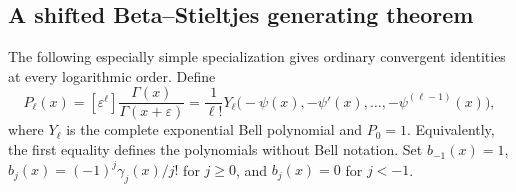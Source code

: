 \subsection{A shifted Beta--Stieltjes generating theorem}

The following especially simple specialization gives ordinary convergent
identities at every logarithmic order. Define
\begin{equation}\label{agrc:Pell}
 P_\ell(x)=[\varepsilon^\ell]\frac{\Gamma(x)}{\Gamma(x+\varepsilon)}
 =\frac1{\ell!}Y_\ell\bigl(-\psi(x),-\psi'(x),\ldots,
                                      -\psi^{(\ell-1)}(x)\bigr),
\end{equation}
where $Y_\ell$ is the complete exponential Bell polynomial and $P_0=1$.
Equivalently, the first equality defines the polynomials without Bell
notation. Set $b_{-1}(x)=1$, $b_j(x)=(-1)^j\gamma_j(x)/j!$ for $j\geq0$,
and $b_j(x)=0$ for $j<-1$.

